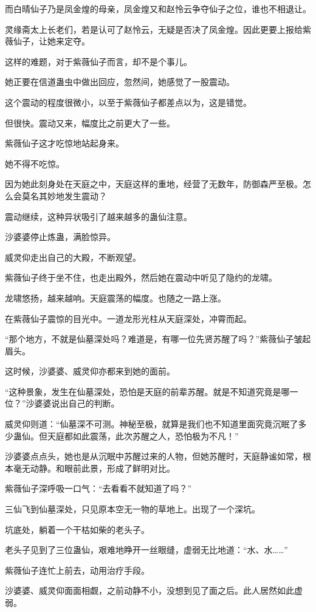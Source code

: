 \begin{this_body}
而白晴仙子乃是凤金煌的母亲，凤金煌又和赵怜云争夺仙子之位，谁也不相退让。

灵缘斋太上长老们，若是认可了赵怜云，无疑是否决了凤金煌。因此更要上报给紫薇仙子，让她来定夺。

这样的难题，对于紫薇仙子而言，却不是个事儿。

她正要在信道蛊虫中做出回应，忽然间，她感觉了一股震动。

这个震动的程度很微小，以至于紫薇仙子都差点以为，这是错觉。

但很快。震动又来，幅度比之前更大了一些。

紫薇仙子这才吃惊地站起身来。

她不得不吃惊。

因为她此刻身处在天庭之中，天庭这样的重地，经营了无数年，防御森严至极。怎么会莫名其妙地发生震动？

震动继续，这种异状吸引了越来越多的蛊仙注意。

沙婆婆停止炼蛊，满脸惊异。

威灵仰走出自己的大殿，不断观望。

紫薇仙子终于坐不住，也走出殿外，然后她在震动中听见了隐约的龙啸。

龙啸悠扬，越来越响。天庭震荡的幅度。也随之一路上涨。

在紫薇仙子震惊的目光中。一道龙形光柱从天庭深处，冲霄而起。

“那个地方，不就是仙墓深处吗？难道是，有哪一位先贤苏醒了吗？”紫薇仙子皱起眉头。

这时候，沙婆婆、威灵仰亦都来到她的面前。

“这种景象，发生在仙墓深处，恐怕是天庭的前辈苏醒。就是不知道究竟是哪一位？”沙婆婆说出自己的判断。

威灵仰则道：“仙墓深不可测。神秘至极，就算是我们也不知道里面究竟沉眠了多少蛊仙。但天庭都如此震荡，此次苏醒之人，恐怕极为不凡！”

沙婆婆点点头，她也是从沉眠中苏醒过来的人物，但她苏醒时，天庭静谧如常，根本毫无动静。和眼前此景，形成了鲜明对比。

紫薇仙子深呼吸一口气：“去看看不就知道了吗？”

三仙飞到仙墓深处，只见原本空无一物的草地上。出现了一个深坑。

坑底处，躺着一个干枯如柴的老头子。

老头子见到了三位蛊仙，艰难地睁开一丝眼缝，虚弱无比地道：“水、水……”

紫薇仙子连忙上前去，动用治疗手段。

沙婆婆、威灵仰面面相觑，之前动静不小，没想到见了面之后。此人居然如此虚弱。


\end{this_body}
